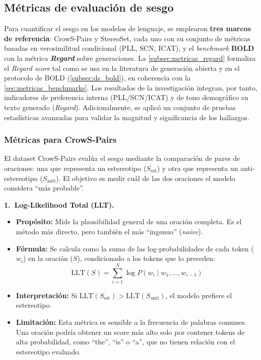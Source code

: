 \documentclass[12pt,a4paper]{report}
\begin{document}
\subsection{Métricas de evaluación de sesgo}
\label{subsec:metricas_evaluacion_teorico}

Para cuantificar el sesgo en los modelos de lenguaje, se emplearon \textbf{tres marcos de referencia}: CrowS-Pairs y StereoSet, cada uno con su conjunto de métricas basadas en verosimilitud condicional (PLL, SCN, ICAT), y el \textit{benchmark} \textbf{BOLD} con la métrica \textbf{\textit{Regard}} sobre generaciones. La \autoref{subsec:metricas_regard} formaliza el \textit{Regard score} tal como se usa en la literatura de generación abierta y en el protocolo de BOLD (\autoref{subsec:ds_bold}), en coherencia con la \autoref{sec:metricas_benchmarks}. Los resultados de la investigación integran, por tanto, indicadores de preferencia interna (PLL/SCN/ICAT) y de tono demográfico en texto generado (\textit{Regard}). Adicionalmente, se aplicó un conjunto de pruebas estadísticas avanzadas para validar la magnitud y significancia de los hallazgos.

\subsubsection{Métricas para CrowS-Pairs}
\label{subsec:metricas_crows}

El dataset CrowS-Pairs evalúa el sesgo mediante la comparación de pares de oraciones: una que representa un estereotipo ($S_{\text{est}}$) y otra que representa un anti-estereotipo ($S_{\text{anti}}$). El objetivo es medir cuál de las dos oraciones el modelo considera ``más probable''.

\noindent\textbf{1.\ Log-Likelihood Total (LLT).}
\begin{itemize}
    \item \textbf{Propósito:} Mide la plausibilidad general de una oración completa. Es el método más directo, pero también el más ``ingenuo'' (\textit{naive}).
    \item \textbf{Fórmula:} Se calcula como la suma de las log-probabilidades de cada token ($w_i$) en la oración ($S$), condicionado a los tokens que lo preceden:
    \begin{equation}
        \text{LLT}(S) = \sum_{i=1}^{N} \log P(w_i \mid w_1, \dots, w_{i-1})
    \end{equation}
    \item \textbf{Interpretación:} Si $\text{LLT}(S_{\text{est}}) > \text{LLT}(S_{\text{anti}})$, el modelo prefiere el estereotipo.
    \item \textbf{Limitación:} Esta métrica es sensible a la frecuencia de palabras comunes. Una oración podría obtener un score más alto solo por contener tokens de alta probabilidad, como ``the'', ``is'' o ``a'', que no tienen relación con el estereotipo evaluado.
\end{itemize}
\end{document}
